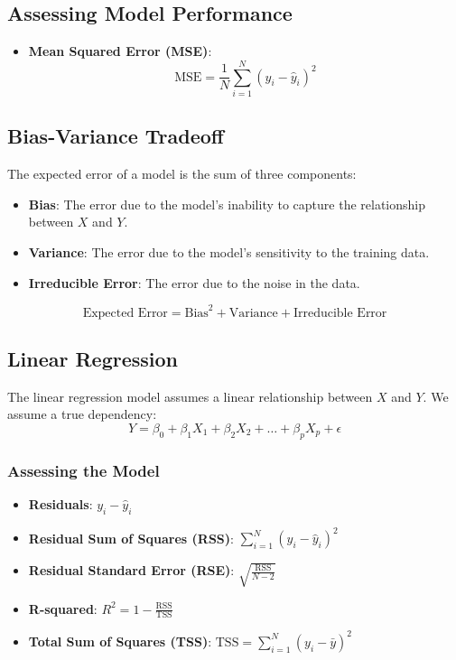 \subsection*{Assessing Model Performance}
\begin{itemize}[noitemsep]
    \item \textbf{Mean Squared Error (MSE)}: 
    $$\text{MSE} = \frac{1}{N} \sum_{i=1}^{N} (y_i - \hat{y}_i)^2$$
\end{itemize}

\subsection*{Bias-Variance Tradeoff}
The expected error of a model is the sum of three components:
\begin{itemize}[noitemsep]
    \item \textbf{Bias}: The error due to the model's inability to capture the relationship between $X$ and $Y$.
    \item \textbf{Variance}: The error due to the model's sensitivity to the training data.
    \item \textbf{Irreducible Error}: The error due to the noise in the data.
\end{itemize}

$$\text{Expected Error} = \text{Bias}^2 + \text{Variance} + \text{Irreducible Error}$$

\subsection*{Linear Regression}
The linear regression model assumes a linear relationship between $X$ and $Y$. We assume a true dependency:
$$Y = \beta_0 + \beta_1 X_1 + \beta_2 X_2 + \ldots + \beta_p X_p + \epsilon$$

\subsubsection*{Assessing the Model}
\begin{itemize}[noitemsep]
    \item \textbf{Residuals}: $y_i - \hat{y}_i$
    \item \textbf{Residual Sum of Squares (RSS)}: $\sum_{i=1}^{N} (y_i - \hat{y}_i)^2$
    \item \textbf{Residual Standard Error (RSE)}: $\sqrt{\frac{\text{RSS}}{N-2}}$
    \item \textbf{R-squared}: $R^2 = 1 - \frac{\text{RSS}}{\text{TSS}}$
    \item \textbf{Total Sum of Squares (TSS)}: $\text{TSS} = \sum_{i=1}^{N} (y_i - \bar{y})^2$
\end{itemize}

